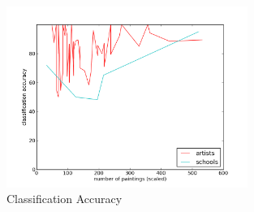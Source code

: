 \documentclass[11pt,a4paper,draft]{report}
\begin{document}
\begin{multicols}{2}
\begin{figure}[tbp]
\centering
\includegraphics[width=0.7\textwidth]{class-graph}
\caption[Classification]{Classification Accuracy}
\label{fig:class}
\end{figure}


\end{multicols}
\end{document}
